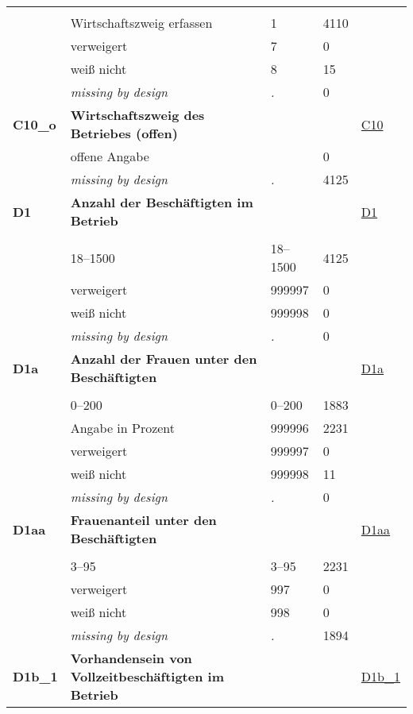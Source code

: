 \begin{longtable}{| L{2.65cm} | L{8cm} | C{1.5cm} | R{1.25cm} | C{2.25cm}  |}
   &  &  &  &  \\ 
   & Wirtschaftszweig erfassen & 1 & 4110 &  \\ 
   & verweigert & 7 & 0 &  \\ 
   & weiß nicht & 8 & 15 &  \\ 
   & \textit{missing by design} & \textit{.} & 0 &  \\ 
   \midrule
\textbf{C10\_o}\label{var:C10:o} & \textbf{Wirtschaftszweig des Betriebes (offen)} &  &  & \hyperref[C10]{C10} \\ 
   & offene Angabe &  & 0 &  \\ 
   & \textit{missing by design} & \textit{.} & 4125 &  \\ 
   \midrule
\textbf{D1}\label{var:D1} & \textbf{Anzahl der Beschäftigten im Betrieb} &  &  & \hyperref[D1]{D1} \\ 
   &  &  &  &  \\ 
   & 18--1500 & 18--1500 & 4125 &  \\ 
   & verweigert & 999997 & 0 &  \\ 
   & weiß nicht & 999998 & 0 &  \\ 
   & \textit{missing by design} & \textit{.} & 0 &  \\ 
   \midrule
\textbf{D1a}\label{var:D1a} & \textbf{Anzahl der Frauen unter den Beschäftigten} &  &  & \hyperref[D1a]{D1a} \\ 
   &  &  &  &  \\ 
   & 0--200 & 0--200 & 1883 &  \\ 
   & Angabe in Prozent & 999996 & 2231 &  \\ 
   & verweigert & 999997 & 0 &  \\ 
   & weiß nicht & 999998 & 11 &  \\ 
   & \textit{missing by design} & \textit{.} & 0 &  \\ 
   \midrule
\textbf{D1aa}\label{var:D1aa} & \textbf{Frauenanteil unter den Beschäftigten} &  &  & \hyperref[D1aa]{D1aa} \\ 
   &  &  &  &  \\ 
   & 3--95 & 3--95 & 2231 &  \\ 
   & verweigert & 997 & 0 &  \\ 
   & weiß nicht & 998 & 0 &  \\ 
   & \textit{missing by design} & \textit{.} & 1894 &  \\ 
   \midrule
\textbf{D1b\_1}\label{var:D1b:1} & \textbf{Vorhandensein von Vollzeitbeschäftigten im Betrieb} &  &  & \hyperref[D1b:1]{D1b\_1} \\ 

\end{longtable}
